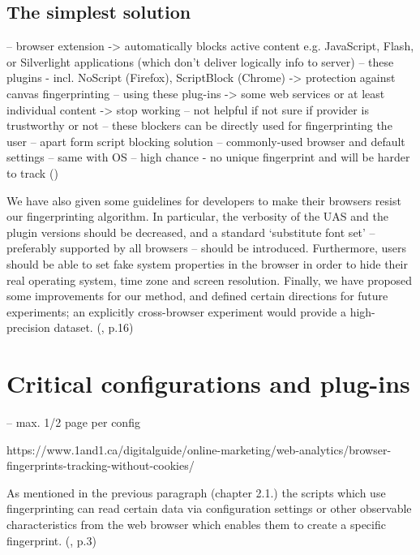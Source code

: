 \subsection{The simplest solution}

-- browser extension -> automatically blocks active content e.g. JavaScript, Flash, or Silverlight applications (which don't deliver logically info to server)
-- these plugins - incl. NoScript (Firefox), ScriptBlock (Chrome) -> protection against canvas fingerprinting
-- using these plug-ins -> some web services or at least individual content -> stop working
-- not helpful if not sure if provider is trustworthy or not
-- these blockers can be directly used for fingerprinting the user
-- apart form script blocking solution
-- commonly-used browser and default settings
-- same with OS
-- high chance - no unique fingerprint and will be harder to track
(\textcite{web17})

We have also given some guidelines for developers to make their browsers resist
our fingerprinting algorithm. In particular, the verbosity of the UAS and the plugin
versions should be decreased, and a standard ‘substitute font set’ – preferably
supported by all browsers – should be introduced. Furthermore, users should be able
to set fake system properties in the browser in order to hide their real operating
system, time zone and screen resolution.
Finally, we have proposed some improvements for our method, and defined certain
directions for future experiments; an explicitly cross-browser experiment would
provide a high-precision dataset. 
(\textcite{boda11}, p.16)

\newpage
\section{Critical configurations and plug-ins}
-- max. 1/2 page per config

https://www.1and1.ca/digitalguide/online-marketing/web-analytics/browser-fingerprints-tracking-without-cookies/

As mentioned in the previous paragraph (chapter 2.1.) the scripts which use fingerprinting can read certain data via configuration settings or other observable characteristics from the web browser which enables them to create a specific fingerprint. (\textcite{doty18}, p.3)

